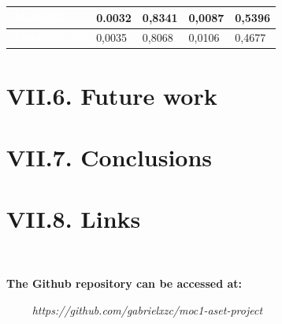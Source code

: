 \documentclass[11pt, a4papper]{report}
\theoremstyle{plain}
\theoremstyle{definition}
\theoremstyle{definition}
\theoremstyle{proposition}
\begin{document}
\begin{center}
\begin{footnotesize}
\begin{tabular}{ | M{4.6cm} | m{2cm} | m{2cm} |m{2cm} | m{2cm}}
\hline
{}
\textit{\textbf{\textcolor{white}{MobileNet}}}&   {0.0032} &   {0,8341} 
&   {0,0087} 
&   {0,5396}  \\
\hline
{}
\textit{\textbf{\textcolor{white}{MobileNetV2}}}&   {0,0035} &   {0,8068} 
&   {0,0106} 
&   {0,4677}  \\
\hline
\end{tabular}
\end{footnotesize}
\end{center}

\section*{VII.6. Future work}


\section*{VII.7. Conclusions}


\section*{VII.8. Links}
\

\textbf{\footnotemark The Github repository can be accessed at:}


\ \ \ \ \hspace{2cm} \textit{https://github.com/gabrielxzc/moc1-aset-project}
\\
\end{document}
